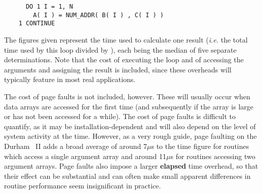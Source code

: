 \begin{verbatim}
      DO 1 I = 1, N
        A( I ) = NUM_ADDR( B( I ) , C( I ) )
    1 CONTINUE
\end{verbatim}

The figures given represent the  time used to calculate one result
({\em i.e.} the total  time used by this loop divided by
), each being the median of five separate determinations. 
Note that the cost of executing the loop and of accessing the arguments and
assigning the result is included, since these overheads will typically
feature in most real applications. 

The cost of page faults is not included, however.
These will usually occur when data arrays are accessed for the first time
(and subsequently if the array is large or has not been accessed for a while).
The cost of page faults is difficult to quantify, as it may be
installation-dependent and will also depend on the level of system activity
at the time. 
However, as a very rough guide, page faulting on the Durham ~II
adds a broad average of around 7$\mu$s to the  time figure for
routines which access a single  argument array and around 11$\mu$s
for routines accessing two  argument arrays.
Page faults also impose a larger {\bf elapsed} time overhead, so that their
effect can be substantial and can often make small apparent differences in
routine performance seem insignificant in practice. 

\newpage

